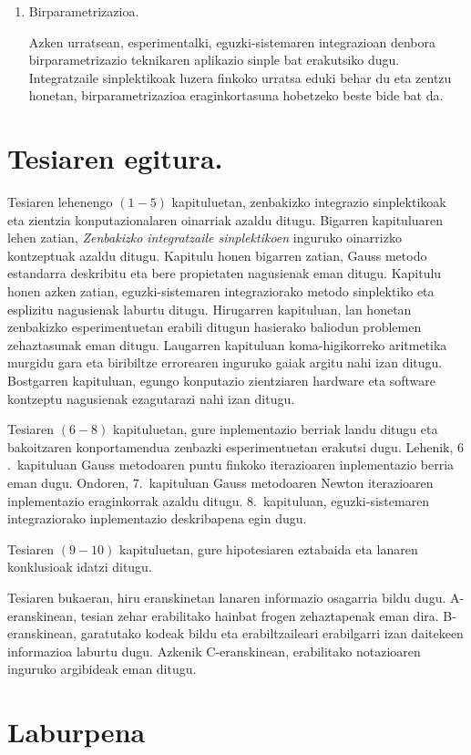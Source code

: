 \begin{enumerate}
\item Birparametrizazioa.

Azken urratsean, esperimentalki, eguzki-sistemaren integrazioan  denbora birparametrizazio teknikaren aplikazio sinple bat erakutsiko dugu. Integratzaile sinplektikoak luzera finkoko urratsa eduki behar du eta zentzu honetan, birparametrizazioa eraginkortasuna hobetzeko beste bide bat da.      

\end{enumerate}        


\section{Tesiaren egitura.}

Tesiaren lehenengo $(1-5)$ kapituluetan, zenbakizko integrazio sinplektikoak eta zientzia konputazionalaren oinarriak azaldu ditugu. Bigarren kapituluaren lehen zatian, \emph{Zenbakizko integratzaile sinplektikoen} inguruko oinarrizko kontzeptuak azaldu ditugu. Kapitulu honen bigarren zatian, Gauss metodo estandarra deskribitu eta bere propietaten nagusienak eman ditugu. Kapitulu honen azken zatian, eguzki-sistemaren integraziorako metodo sinplektiko eta esplizitu nagusienak laburtu ditugu. Hirugarren kapituluan, lan honetan zenbakizko esperimentuetan erabili ditugun hasierako baliodun problemen zehaztasunak eman ditugu. Laugarren kapituluan koma-higikorreko aritmetika murgidu gara eta biribiltze errorearen inguruko gaiak argitu nahi izan ditugu. Bostgarren kapituluan, egungo konputazio zientziaren hardware eta software kontzeptu nagusienak ezagutarazi nahi izan ditugu.     

Tesiaren $(6-8)$ kapituluetan, gure inplementazio berriak landu ditugu eta bakoitzaren konportamendua zenbazki esperimentuetan erakutsi dugu. Lehenik, $6$.~kapituluan Gauss metodoaren puntu finkoko iterazioaren inplementazio berria eman dugu. Ondoren, $7$.~kapituluan Gauss metodoaren Newton iterazioaren inplementazio eraginkorrak azaldu ditugu. $8$.~kapituluan, eguzki-sistemaren integraziorako inplementazio deskribapena egin dugu.  

Tesiaren $(9-10)$ kapituluetan, gure hipotesiaren eztabaida eta lanaren konklusioak idatzi ditugu.

Tesiaren bukaeran, hiru eranskinetan lanaren informazio osagarria bildu dugu. A-eranskinean, tesian zehar erabilitako hainbat frogen zehaztapenak eman dira. B-eranskinean, garatutako kodeak bildu eta erabiltzaileari erabilgarri izan daitekeen informazioa laburtu dugu. Azkenik C-eranskinean, erabilitako notazioaren inguruko argibideak eman ditugu.

      
      
\section{Laburpena}

